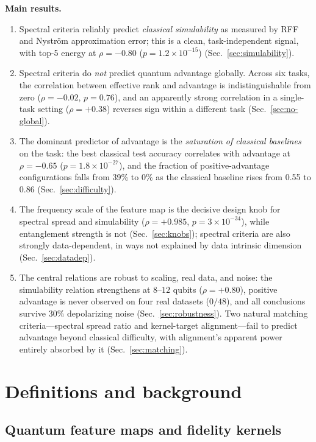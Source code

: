 \documentclass[a4paper,unpublished,onecolumn,nopdfoutputerror,12pt]{quantumarticle}
\begin{document}
\textbf{Main results.}
\begin{enumerate}
\item Spectral criteria reliably predict \emph{classical simulability} as measured by
RFF and Nystr\"om approximation error; this is a clean, task-independent signal, with
top-5 energy at $\rho=-0.80$ ($p=1.2\times10^{-15}$) (Sec.~\ref{sec:simulability}).
\item Spectral criteria do \emph{not} predict quantum advantage globally. Across six
tasks, the correlation between effective rank and advantage is indistinguishable from
zero ($\rho=-0.02$, $p=0.76$), and an apparently strong correlation in a single-task
setting ($\rho=+0.38$) reverses sign within a different task (Sec.~\ref{sec:no-global}).
\item The dominant predictor of advantage is the \emph{saturation of classical
baselines} on the task: the best classical test accuracy correlates with advantage at
$\rho=-0.65$ ($p=1.8\times10^{-27}$), and the fraction of positive-advantage
configurations falls from 39\% to 0\% as the classical baseline rises from 0.55 to
0.86 (Sec.~\ref{sec:difficulty}).
\item The frequency scale of the feature map is the decisive design knob for spectral
spread and simulability ($\rho=+0.985$, $p=3\times10^{-34}$), while entanglement
strength is not (Sec.~\ref{sec:knobs}); spectral criteria are also strongly
data-dependent, in ways not explained by data intrinsic dimension
(Sec.~\ref{sec:datadep}).
\item The central relations are robust to scaling, real data, and noise: the
simulability relation strengthens at $8$--$12$ qubits ($\rho=+0.80$), positive advantage
is never observed on four real datasets ($0/48$), and all conclusions survive $30\%$
depolarizing noise (Sec.~\ref{sec:robustness}). Two natural matching criteria---spectral
spread ratio and kernel-target alignment---fail to predict advantage beyond classical
difficulty, with alignment's apparent power entirely absorbed by it
(Sec.~\ref{sec:matching}).
\end{enumerate}

\section{Definitions and background}
\label{sec:defs}

\subsection{Quantum feature maps and fidelity kernels}
\label{sec:defs-fm}
\end{document}
